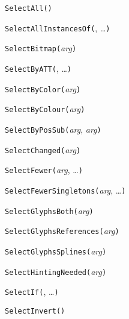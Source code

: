 
\noindent\texttt{SelectAll(}\texttt{)}


\noindent\texttt{SelectAllInstancesOf(}, \ldots\texttt{)}


\noindent\texttt{SelectBitmap(}\textit{arg}\texttt{)}


\noindent\texttt{SelectByATT(}, \ldots\texttt{)}


\noindent\texttt{SelectByColor(}\textit{arg}\texttt{)}


\noindent\texttt{SelectByColour(}\textit{arg}\texttt{)}


\noindent\texttt{SelectByPosSub(}\textit{arg}, \textit{arg}\texttt{)}


\noindent\texttt{SelectChanged(}\textit{arg}\texttt{)}


\noindent\texttt{SelectFewer(}\textit{arg}, \ldots\texttt{)}


\noindent\texttt{SelectFewerSingletons(}\textit{arg}, \ldots\texttt{)}


\noindent\texttt{SelectGlyphsBoth(}\textit{arg}\texttt{)}


\noindent\texttt{SelectGlyphsReferences(}\textit{arg}\texttt{)}


\noindent\texttt{SelectGlyphsSplines(}\textit{arg}\texttt{)}


\noindent\texttt{SelectHintingNeeded(}\textit{arg}\texttt{)}


\noindent\texttt{SelectIf(}, \ldots\texttt{)}


\noindent\texttt{SelectInvert(}\texttt{)}

